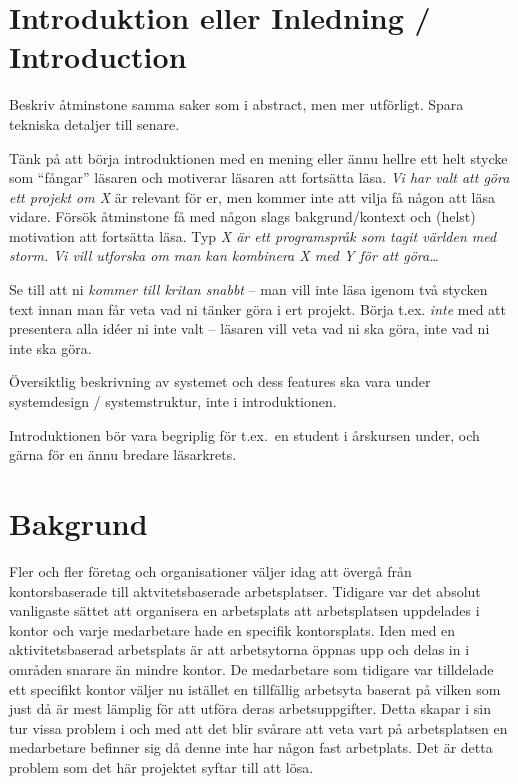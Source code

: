 \documentclass[a4paper,12pt]{article}
\begin{document}
\newpage %

\section{Introduktion eller Inledning / Introduction}
Beskriv åtminstone samma saker som i abstract, men mer utförligt. Spara tekniska detaljer till senare.

Tänk på att börja introduktionen med en mening eller ännu hellre ett helt stycke som ``fångar'' läsaren och motiverar läsaren att fortsätta läsa.  \emph{Vi har valt att göra ett projekt om X} är relevant för er, men kommer inte att vilja få någon att läsa vidare.  Försök åtminstone få med någon slags bakgrund/kontext och (helst) motivation att fortsätta läsa.  Typ \emph{X är ett programspråk som tagit världen med storm.  Vi vill utforska om man kan kombinera X med Y för att göra\ldots}

Se till att ni \emph{kommer till kritan snabbt} – man vill inte läsa igenom två stycken text innan man får veta vad ni tänker göra i ert projekt.  Börja t.ex. \emph{inte} med att presentera alla idéer ni inte valt – läsaren vill veta vad ni ska göra, inte vad ni inte ska göra.

Översiktlig beskrivning av systemet och dess features ska vara under systemdesign / systemstruktur, inte i introduktionen.

Introduktionen bör vara begriplig för t.ex.~en student i årskursen under, och gärna för en ännu bredare läsarkrets.

\section{Bakgrund}
Fler och fler företag och organisationer väljer idag att övergå från kontorsbaserade till aktvitetsbaserade
arbetsplatser. Tidigare var det absolut vanligaste sättet att organisera en arbetsplats att arbetsplatsen uppdelades i kontor och varje medarbetare hade en specifik kontorsplats.
Iden med en aktivitetsbaserad arbetsplats är att arbetsytorna öppnas upp och delas in i områden snarare än mindre kontor. De medarbetare som tidigare var tilldelade ett specifikt kontor
väljer nu istället en tillfällig arbetsyta baserat på vilken som just då
är mest lämplig för att utföra deras arbetsuppgifter.
\bigskip
\newline
Detta skapar i sin tur vissa problem i och med att det blir svårare att veta vart på arbetsplatsen en medarbetare befinner sig då denne inte har någon fast arbetplats.
Det är detta problem som det här projektet syftar till att lösa.
\end{document}
